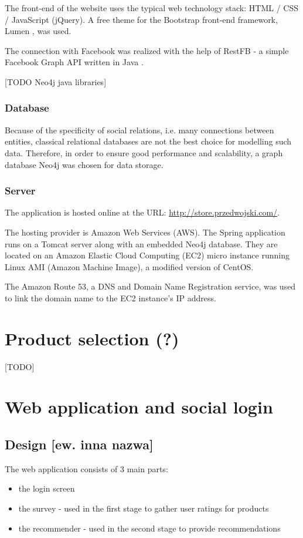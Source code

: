 \documentclass[12pt]{report}
\begin{document}
The front-end of the website uses the typical web technology stack: HTML / CSS / JavaScript (jQuery). A free theme for the Bootstrap front-end framework, Lumen \cite{lumen}, was used.

The connection with Facebook was realized with the help of RestFB - a simple Facebook Graph API written in Java \cite{restfb}.

\hbox{}
[TODO Neo4j java libraries]

\subsubsection{Database}

Because of the specificity of social relations, i.e. many connections between entities, classical relational databases are not the best choice for modelling such data. Therefore, in order to ensure good performance and scalability, a graph database Neo4j \cite{neo4j} was chosen for data storage.

\subsubsection{Server}

The application is hosted online at the URL: \url{http://store.przedwojski.com/}. 

The hosting provider is Amazon Web Services (AWS). The Spring application runs on a Tomcat server along with an embedded Neo4j database. They are located on an Amazon Elastic Cloud Computing (EC2) micro instance running Linux AMI (Amazon Machine Image), a modified version of CentOS.

The Amazon Route 53, a DNS and Domain Name Registration service, was used to link the domain name to the EC2 instance's IP address.

\section{Product selection (?)}
[TODO]

\section{Web application and social login}
\subsection{Design [ew. inna nazwa]}

The web application consists of 3 main parts:
\begin{itemize}
\item the login screen
\item the survey - used in the first stage to gather user ratings for products
\item the recommender - used in the second stage to provide recommendations
\end{itemize}
\end{document}
